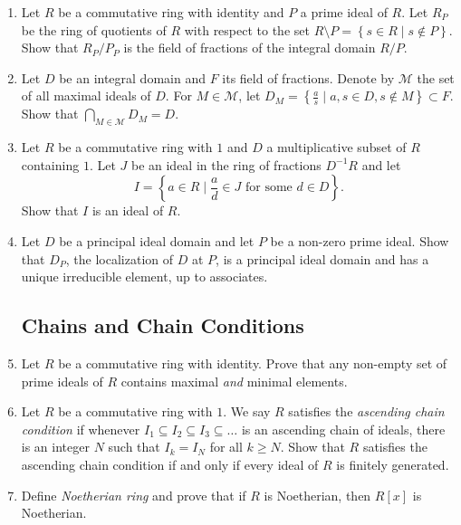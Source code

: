 \documentclass{article}
\theoremstyle{definition}
\newcommand{\set}[1]{\left\{#1\right\}}
\newcommand{\inv}[1]{{#1}^{-1}}
\begin{document}
\begin{enumerate}
            \item Let $R$ be a commutative ring with identity and $P$ a prime ideal of $R$. Let $R_P$ be the ring of quotients of $R$ with respect to the set $R\setminus P=\set{s\in R \mid s\notin P}$. Show that $R_P/P_P$ is the field of fractions of the integral domain $R/P$.
            
            \item Let $D$ be an integral domain and $F$ its field of fractions. Denote by $\mathcal{M}$ the set of all maximal ideals of $D$. For $M\in \mathcal{M}$, let $D_M=\set{\frac{a}{s} \mid a,s\in D, s\notin M}\subset F$. Show that $\bigcap _{M\in \mathcal{M}} D_M=D$.
            
            \item Let $R$ be a commutative ring with $1$ and $D$ a multiplicative subset of $R$ containing $1$. Let $J$ be an ideal in the ring of fractions $\inv{D}R$ and let \[I=\set{a\in R \mid \frac{a}{d} \in J \text{ for some } d\in D}.\] Show that $I$ is an ideal of $R$.
            
            \item Let $D$ be a principal ideal domain and let $P$ be a non-zero prime ideal. Show that $D_P$, the localization of $D$ at $P$, is a principal ideal domain and has a unique irreducible element, up to associates.

        \subsection{Chains and Chain Conditions}

            \item Let $R$ be a commutative ring with identity. Prove that any non-empty set of prime ideals of $R$ contains maximal \textit{and} minimal elements.
            
            \item Let $R$ be a commutative ring with $1$. We say $R$ satisfies the \textit{ascending chain condition} if whenever $I_1 \subseteq I_2 \subseteq I_3 \subseteq \hdots$ is an ascending chain of ideals, there is an integer $N$ such that $I_k=I_N$ for all $k\geq N$. Show that $R$ satisfies the ascending chain condition if and only if every ideal of $R$ is finitely generated. 
            
            \item Define \textit{Noetherian ring} and prove that if $R$ is Noetherian, then $R[x]$ is Noetherian.
            

\end{enumerate}
\end{document}
